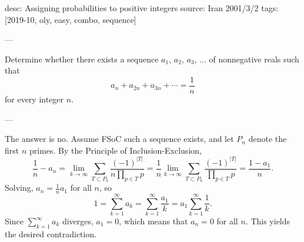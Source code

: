 desc: Assigning probabilities to positive integers
source: Iran 2001/3/2
tags: [2019-10, oly, easy, combo, sequence]

---

Determine whether there exists a sequence $a_1$, $a_2$, $a_3$, $\ldots$ of nonnegative reals such that \[a_n+a_{2n}+a_{3n}+\cdots=\frac1n\]
for every integer $n$.

---

The answer is no. Assume FSoC such a sequence exists, and let $P_n$ denote the first $n$ primes. By the Principle of Inclusion-Exclusion, \[\frac1n-a_n=\lim_{k\to\infty}\sum_{T\subset P_k}\frac{(-1)^{|T|}}{n\prod_{p\in T}p}=\frac1n\lim_{k\to\infty}\sum_{T\subset P_k}\frac{(-1)^{|T|}}{\prod_{p\in T}p}=\frac{1-a_1}n.\]
Solving, $a_n=\tfrac1na_1$ for all $n$, so \[1=\sum_{k=1}^\infty a_k=\sum_{k=1}^\infty\frac{a_1}k=a_1\sum_{k=1}^\infty\frac1k.\]
Since $\sum_{k=1}^\infty a_k$ diverges, $a_1=0$, which means that $a_n=0$ for all $n$. This yields the desired contradiction.
